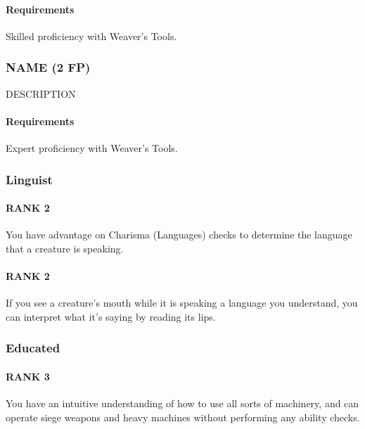     \paragraph{Requirements} Skilled proficiency with Weaver's Tools.
\subsubsection{NAME (2 FP)} \label{feat::name}
    DESCRIPTION
    \paragraph{Requirements} Expert proficiency with Weaver's Tools.

\subsubsection{Linguist} \label{feat::linguist}
\paragraph{RANK 2} You have advantage on Charisma (Languages) checks to determine the language that a creature is speaking.
\paragraph{RANK 2} If you see a creature's mouth while it is speaking a language you understand, you can interpret what it's saying by reading its lips.

\subsubsection{Educated} \label{feat::educated}
\paragraph{RANK 3} You have an intuitive understanding of how to use all sorts of machinery, and can operate siege weapons and heavy machines without performing any ability checks.
